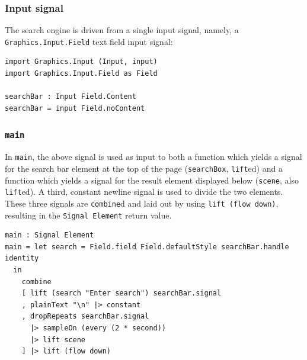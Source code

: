 \documentclass[12pt]{article}
\begin{document}
\subsubsection{Input signal}
The search engine is driven from a single input signal, namely, a \texttt{Graphics.Input.Field} text field input signal:
\begin{samepage}
\begin{verbatim}
import Graphics.Input (Input, input)
import Graphics.Input.Field as Field

searchBar : Input Field.Content
searchBar = input Field.noContent
\end{verbatim}
\end{samepage}
\subsubsection{\texttt{main}}
\label{sec:main}
In \texttt{main}, the above signal is used as input to both a function which yields a signal for the search bar element at the top of the page (\texttt{searchBox}, \texttt{lift}ed) and a function which yields a signal for the result element displayed below (\texttt{scene}, also \texttt{lift}ed). A third, constant newline signal is used to divide the two elements. These
three signals are \texttt{combine}d and laid out by using \texttt{lift (flow down)}, resulting in the \texttt{Signal Element} return value.
\begin{samepage}
\begin{verbatim}
main : Signal Element
main = let search = Field.field Field.defaultStyle searchBar.handle identity
  in
    combine
    [ lift (search "Enter search") searchBar.signal
    , plainText "\n" |> constant
    , dropRepeats searchBar.signal 
      |> sampleOn (every (2 * second)) 
      |> lift scene
    ] |> lift (flow down)
\end{verbatim}
\end{samepage}
\end{document}
